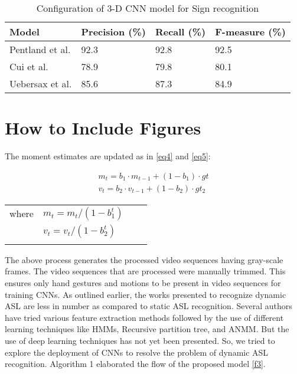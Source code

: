 \documentclass[
  manuscript=article,  %
  layout=preprint,  %
  year=20xx,
  volume=x,
]{ledger}
\begin{document}
\begin{table}[!ht]
\caption{ Configuration of 3-D CNN model for Sign recognition\label{tab1}}
\begin{tabular*}{\columnwidth}{@{\extracolsep\fill}llll@{\extracolsep\fill}}
\toprule
Model & Precision (\%) & Recall (\%) & F-measure (\%)\\
\midrule
Pentland et al. & 92.3 & 92.8 & 92.5\\
Cui et al. & 78.9 & 79.8 & 80.1 \\
Uebersax et al. & 85.6 &87.3 & 84.9 \\
\bottomrule
\end{tabular*}
\end{table}






\section{How to Include Figures}\label{sec6}

The moment estimates are updated as in \ref{eq4} and \ref{eq5}:


\begin{minipage}[h]{1\textwidth}
\begin{align}
m_{t}=b_{1} \cdot m_{t-1}+(1-b_{1}) \cdot gt\label{eq4} \\ 
v_{t}=b_{2} \cdot v_{t-1}+(1-b_{2}) \cdot gt_{2} \label{eq5}
\end{align}
\begin{tabular}{llll}
    where & $m_{t} = m_{t}/ (1-b^t_{1}) $ \\
    \addlinespace
    & $v_{t} = v_{t}/ (1-b^t_{2}) $ \\
    \addlinespace
\end{tabular}
\end{minipage}

The above process generates the processed video sequences having gray-scale frames. The video sequences that are processed were manually trimmed. This ensures only hand gestures and motions to be present in video sequences for training CNNs. As outlined earlier, the works presented to recognize dynamic ASL are less in number as compared to static ASL recognition. Several authors have tried various feature extraction methods followed by the use of different learning techniques like HMMs, Recursive partition tree, and ANMM. But the use of deep learning techniques has not yet been presented. So, we tried to explore the deployment of CNNs to resolve the problem of dynamic ASL recognition. Algorithm 1 elaborated the flow of the proposed model \ref{f3}.
\end{document}
